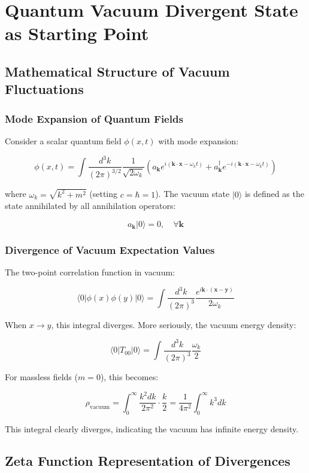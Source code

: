 \documentclass[12pt,a4paper]{article}
\begin{document}
\section{Quantum Vacuum Divergent State as Starting Point}

\subsection{Mathematical Structure of Vacuum Fluctuations}

\subsubsection{Mode Expansion of Quantum Fields}

Consider a scalar quantum field $\phi(x,t)$ with mode expansion:

$$\phi(x,t) = \int \frac{d^3k}{(2\pi)^{3/2}} \frac{1}{\sqrt{2\omega_k}} \left( a_{\mathbf{k}} e^{i(\mathbf{k} \cdot \mathbf{x} - \omega_k t)} + a_{\mathbf{k}}^{\dagger} e^{-i(\mathbf{k} \cdot \mathbf{x} - \omega_k t)} \right)$$

where $\omega_k = \sqrt{k^2 + m^2}$ (setting $c = \hbar = 1$). The vacuum state $|0\rangle$ is defined as the state annihilated by all annihilation operators:

$$a_{\mathbf{k}}|0\rangle = 0, \quad \forall \mathbf{k}$$

\subsubsection{Divergence of Vacuum Expectation Values}

The two-point correlation function in vacuum:

$$\langle 0 | \phi(x) \phi(y) | 0 \rangle = \int \frac{d^3k}{(2\pi)^3} \frac{e^{i\mathbf{k} \cdot (\mathbf{x} - \mathbf{y})}}{2\omega_k}$$

When $x \to y$, this integral diverges. More seriously, the vacuum energy density:

$$\langle 0 | T_{00} | 0 \rangle = \int \frac{d^3k}{(2\pi)^3} \frac{\omega_k}{2}$$

For massless fields ($m = 0$), this becomes:

$$\rho_{\text{vacuum}} = \int_0^{\infty} \frac{k^2 dk}{2\pi^2} \cdot \frac{k}{2} = \frac{1}{4\pi^2} \int_0^{\infty} k^3 dk$$

This integral clearly diverges, indicating the vacuum has infinite energy density.

\subsection{Zeta Function Representation of Divergences}
\end{document}
